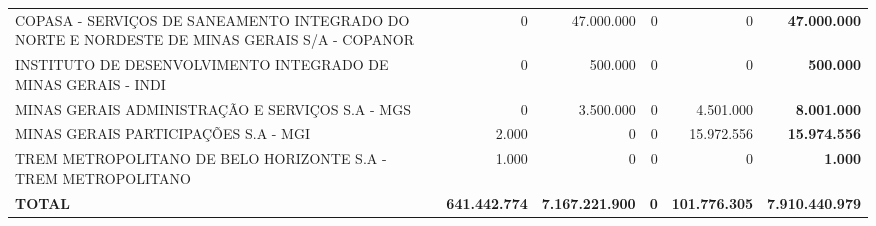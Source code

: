 \documentclass{article}
\begin{document}
\begin{longtable}[c]{m{5.5cm}|m{2.5cm}|m{2.5cm}|m{2.5cm}|m{2cm}|m{2cm}}
\multicolumn{1}{L{5.5cm}|}{COPASA - SERVIÇOS DE SANEAMENTO INTEGRADO DO NORTE E NORDESTE DE MINAS GERAIS S/A - COPANOR} & \multicolumn{1}{r|}{          0} & \multicolumn{1}{r|}{47.000.000} & \multicolumn{1}{r|}{0} & \multicolumn{1}{r|}{          0} & \multicolumn{1}{r}{ \textbf{47.000.000}} \\
\multicolumn{1}{L{5.5cm}|}{INSTITUTO DE DESENVOLVIMENTO INTEGRADO DE MINAS GERAIS - INDI} & \multicolumn{1}{r|}{          0} & \multicolumn{1}{r|}{500.000} & \multicolumn{1}{r|}{0} & \multicolumn{1}{r|}{          0} & \multicolumn{1}{r}{ \textbf{500.000}} \\
\multicolumn{1}{L{5.5cm}|}{MINAS GERAIS ADMINISTRAÇÃO E SERVIÇOS S.A - MGS} & \multicolumn{1}{r|}{          0} & \multicolumn{1}{r|}{3.500.000} & \multicolumn{1}{r|}{0} & \multicolumn{1}{r|}{4.501.000} & \multicolumn{1}{r}{ \textbf{8.001.000}} \\
\multicolumn{1}{L{5.5cm}|}{MINAS GERAIS PARTICIPAÇÕES S.A - MGI} & \multicolumn{1}{r|}{2.000} & \multicolumn{1}{r|}{            0} & \multicolumn{1}{r|}{0} & \multicolumn{1}{r|}{15.972.556} & \multicolumn{1}{r}{ \textbf{15.974.556}} \\
\multicolumn{1}{L{5.5cm}|}{TREM METROPOLITANO DE BELO HORIZONTE S.A - TREM METROPOLITANO} & \multicolumn{1}{r|}{1.000} & \multicolumn{1}{r|}{            0} & \multicolumn{1}{r|}{0} & \multicolumn{1}{r|}{          0} & \multicolumn{1}{r}{ \textbf{1.000}} \\
\hline
\multicolumn{1}{L{5.5cm}|}{ \textbf{TOTAL}} & \multicolumn{1}{r|}{ \textbf{641.442.774}} & \multicolumn{1}{r|}{ \textbf{7.167.221.900}} & \multicolumn{1}{r|}{ \textbf{0}} & \multicolumn{1}{r|}{ \textbf{101.776.305}} & \multicolumn{1}{r}{ \textbf{7.910.440.979}} \\\end{longtable}
\end{document}
